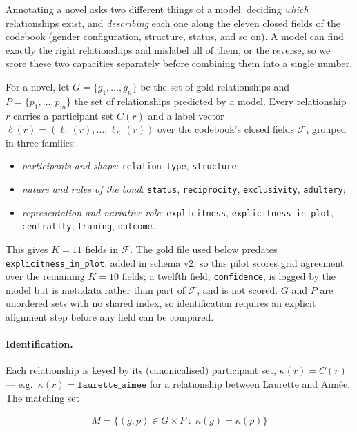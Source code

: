 Annotating a novel asks two different things of a model: deciding \emph{which}
relationships exist, and \emph{describing} each one along the eleven closed fields of the
codebook (gender configuration, structure, status, and so on). A model can find exactly
the right relationships and mislabel all of them, or the reverse, so we score these two
capacities separately before combining them into a single number.

For a novel, let $G = \{g_1, \dots, g_n\}$ be the set of gold relationships and
$P = \{p_1, \dots, p_m\}$ the set of relationships predicted by a model. Every relationship
$r$ carries a participant set $C(r)$ and a label vector $\ell(r) = (\ell_1(r), \dots, \ell_K(r))$
over the codebook's closed fields $\mathcal{F}$, grouped in three families:

\begin{itemize}
  \item \emph{participants and shape}: \texttt{relation\_type}, \texttt{structure};
  \item \emph{nature and rules of the bond}: \texttt{status}, \texttt{reciprocity},
    \texttt{exclusivity}, \texttt{adultery};
  \item \emph{representation and narrative role}: \texttt{explicitness},
    \texttt{explicitness\_in\_plot}, \texttt{centrality}, \texttt{framing}, \texttt{outcome}.
\end{itemize}

This gives $K = 11$ fields in $\mathcal{F}$. The gold file used below predates
\texttt{explicitness\_in\_plot}, added in schema v2, so this pilot scores grid agreement over
the remaining $K = 10$ fields; a twelfth field, \texttt{confidence}, is logged by the model but
is metadata rather than part of $\mathcal{F}$, and is not scored. $G$ and $P$ are unordered
sets with no shared index, so identification requires an explicit alignment step before any
field can be compared.

\paragraph{Identification.} Each relationship is keyed by its (canonicalised) participant
set, $\kappa(r) = C(r)$ — e.g.\ $\kappa(r) = \texttt{laurette\_aimee}$ for a relationship
between Laurette and Aimée. The matching set

\begin{align}
M = \{(g,p) \in G \times P \;:\; \kappa(g) = \kappa(p)\}
\end{align}

